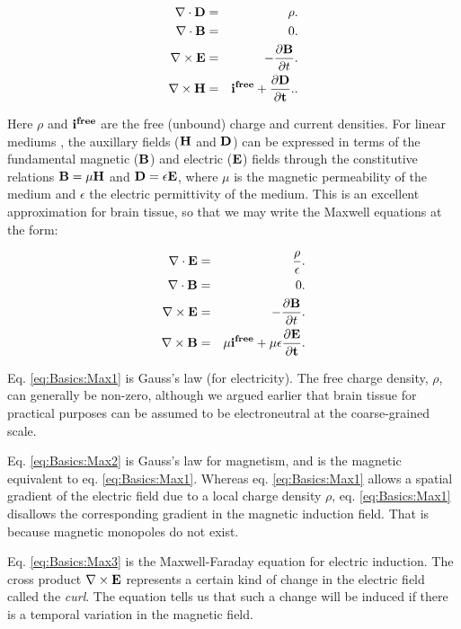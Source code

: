 \begin{eqnarray}
\nabla\cdot {\bf D} & = & \rho. \label{eq:Basics:Max11} \\
\nabla \cdot {\bf B} & = & 0.  \label{eq:Basics:Max22} \\
\nabla \times {\bf E} & = & - \frac{\partial {\bf B}}{\partial t}.  \label{eq:Basics:Max33} \\
\nabla \times {\bf H} & = & \bf{i^{free}} + \frac{\partial {\bf D}}{\partial t}.  \label{eq:Basics:Max44}.
\end{eqnarray}

Here $\rho$ and $\bf{i^{free}}$ are the free (unbound) charge and current densities. For linear mediums , the auxillary fields (${\bf H}$ and ${\bf D}$) can be expressed in terms of the fundamental magnetic (${\bf B}$) and electric (${\bf E}$) fields through the constitutive relations ${\bf B} = \mu{\bf H}$ and ${\bf D} = \epsilon {\bf E}$, where $\mu$ is the magnetic permeability of the medium and $\epsilon$ the electric permittivity of the medium. This is an excellent approximation for brain tissue, so that we may write the Maxwell equations at the form:

\begin{eqnarray}
\nabla\cdot {\bf E} & = & \frac{\rho}{\epsilon}. \label{eq:Basics:Max1} \\
\nabla \cdot {\bf B} & = & 0.  \label{eq:Basics:Max2} \\
\nabla \times {\bf E} & = & - \frac{\partial {\bf B}}{\partial t}.  \label{eq:Basics:Max3} \\
\nabla \times {\bf B} & = & \mu\bf{i}^{free} + \mu\epsilon\frac{\partial {\bf E}}{\partial t}.  \label{eq:Basics:Max4}
\end{eqnarray}

Eq. \ref{eq:Basics:Max1} is Gauss's law (for electricity). The free charge density, $\rho$, can generally be non-zero, although we argued earlier that brain tissue for practical purposes can be assumed to be electroneutral at the coarse-grained scale. 

Eq. \ref{eq:Basics:Max2} is Gauss's law for magnetism, and is the magnetic equivalent to eq. \ref{eq:Basics:Max1}. Whereas eq. \ref{eq:Basics:Max1} allows a spatial gradient of the electric field due to a local charge density $\rho$, eq. \ref{eq:Basics:Max1} disallows the corresponding gradient in the magnetic induction field. That is because magnetic monopoles do not exist. 

Eq. \ref{eq:Basics:Max3} is the Maxwell-Faraday equation for electric induction. The cross product $\nabla \times {\bf E}$ represents a certain kind of change in the electric field called the \textit{curl}. The equation tells us that such a change will be induced if there is a temporal variation in the magnetic field. 

